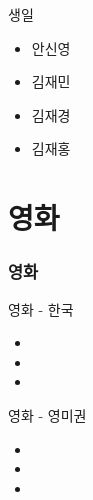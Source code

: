 \documentclass[aspectratio=1610,20pt,xcolor=pdftex,dvipsnames,table,handout]{beamer}
\begin{document}
		\begin{frame} [t,plain]
			\begin{block} {생일 }
			\setlength{\leftmargini}{2em}			
			\begin{itemize}
				\item  안신영
				\item 김재민
				\item 김재경
				\item 김재홍
			\end{itemize}
			\end{block}						

		\end{frame}						


		\begin{frame} [t,plain]
		\end{frame}						


		\section{영화 }

		\begin{frame} [t,plain]
		\frametitle 	{영화}

			\begin{block} {영화 - 한국 }
			\setlength{\leftmargini}{2em}			
			\begin{itemize}
				\item 
				\item 
				\item 
			\end{itemize}
			\end{block}						
		\end{frame}						

		\begin{frame} [t,plain]
			\begin{block} {영화 - 영미권}
			\setlength{\leftmargini}{2em}			
			\begin{itemize}
				\item 
				\item 
				\item 
			\end{itemize}
			\end{block}						
		\end{frame}						
\end{document}
